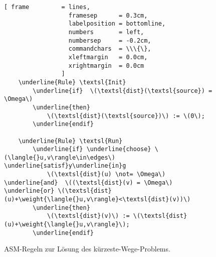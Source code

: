 \begin{figure}[!ht]
  \centering
\begin{Verbatim}[ frame         = lines, 
                  framesep      = 0.3cm, 
                  labelposition = bottomline,
                  numbers       = left,
                  numbersep     = -0.2cm,
                  commandchars  = \\\{\},
                  xleftmargin   = 0.0cm,
                  xrightmargin  = 0.0cm
                ]
    \underline{Rule} \textsl{Init}
        \underline{if}  \(\textsl{dist}(\textsl{source}) = \Omega\)
        \underline{then}
            \(\textsl{dist}(\textsl{source})\) := \(0\);
        \underline{endif}
        
    \underline{Rule} \textsl{Run}
        \underline{if} \underline{choose} \(\langle{}u,v\rangle\in\edges\) \underline{satisf}y\underline{in}g
            \(\textsl{dist}(u) \not= \Omega\) \underline{and}  \((\textsl{dist}(v) = \Omega\) \underline{or} \(\textsl{dist}(u)+\weight{\langle{}u,v\rangle}<\textsl{dist}(v))\)
        \underline{then}
            \(\textsl{dist}(v)\) := \(\textsl{dist}(u)+\weight{\langle{}u,v\rangle}\);
        \underline{endif}
\end{Verbatim}
\vspace*{-0.3cm}
  \caption{ASM-Regeln zur L\"osung des k\"urzeste-Wege-Problems.}
  \label{fig:rule-naive}
\end{figure} 
